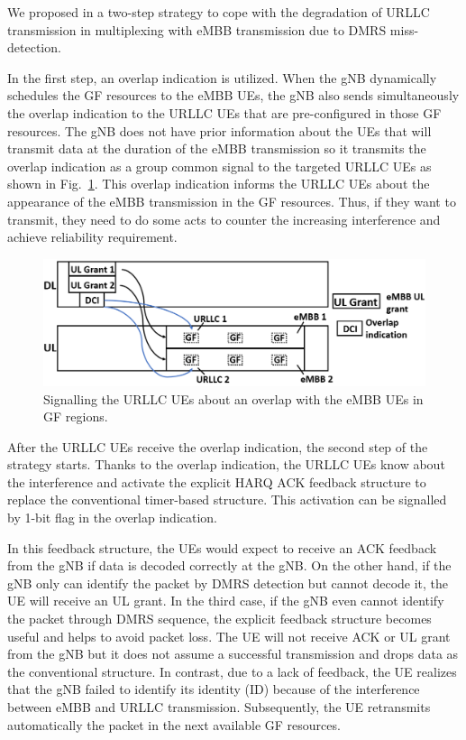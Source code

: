 \documentclass{ieeeaccess}
\begin{document}
We proposed in \cite{ad99} a two-step strategy to cope with the degradation of URLLC transmission in multiplexing with eMBB transmission due to DMRS miss-detection.

In the first step, an overlap indication is utilized. When the gNB dynamically schedules the GF resources to the eMBB UEs, the gNB also sends simultaneously the overlap indication to the URLLC UEs that are pre-configured in those GF resources. The gNB does not have prior information about the UEs that will transmit data at the duration of the eMBB transmission so it transmits the overlap indication as a group common signal to the targeted URLLC UEs as shown in Fig.~\ref{fig2}. This overlap indication informs the URLLC UEs about the appearance of the eMBB transmission in the GF resources. Thus, if they want to transmit, they need to do some acts to counter the increasing interference and achieve reliability requirement.

\begin{figure}[htbp]
\centerline{\includegraphics[scale=0.28]{fig2.PNG}}
\caption{Signalling the URLLC UEs about an overlap with the eMBB UEs in GF regions.}
\label{fig2}
\vspace{-2mm}
\end{figure}

After the URLLC UEs receive the overlap indication, the second step of the strategy starts. Thanks to the overlap indication, the URLLC UEs know about the interference and activate the explicit HARQ ACK feedback structure to replace the conventional timer-based structure. This activation can be signalled by 1-bit flag in the overlap indication. 

In this feedback structure, the UEs would expect to receive an ACK feedback from the gNB if data is decoded correctly at the gNB. On the other hand, if the gNB only can identify the packet by DMRS detection but cannot decode it, the UE will receive an UL grant. In the third case, if the gNB even cannot identify the packet through DMRS sequence, the explicit feedback structure becomes useful and helps to avoid packet loss. The UE will not receive ACK or UL grant from the gNB but it does not assume a successful transmission and drops data as the conventional structure. In contrast, due to a lack of feedback, the UE realizes that the gNB failed to identify its identity (ID) because of the interference between eMBB and URLLC transmission. Subsequently, the UE retransmits automatically the packet in the next available GF resources. 
\end{document}
